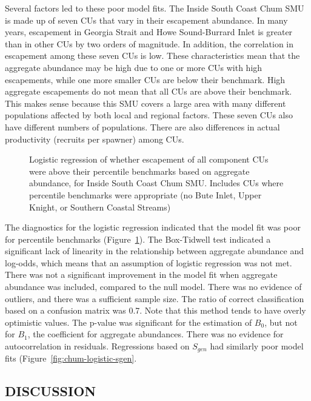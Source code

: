 \documentclass[11pt]{book}
\begin{document}
Several factors led to these poor model fits. The Inside South Coast Chum SMU is made up of seven CUs that vary in their escapement abundance. In many years, escapement in Georgia Strait and Howe Sound-Burrard Inlet is greater than in other CUs by two orders of magnitude. In addition, the correlation in escapement among these seven CUs is low. These characteristics mean that the aggregate abundance may be high due to one or more CUs with high escapements, while one more smaller CUs are below their benchmark. High aggregate escapements do not mean that all CUs are above their benchmark. This makes sense because this SMU covers a large area with many different populations affected by both local and regional factors. These seven CUs also have different numbers of populations. There are also differences in actual productivity (recruits per spawner) among CUs.
\begin{figure}[htb]

{\centering {} 

}

\caption{Logistic regression of whether escapement of all component CUs were above their percentile benchmarks based on aggregate abundance, for Inside South Coast Chum SMU. Includes CUs where percentile benchmarks were appropriate (no Bute Inlet, Upper Knight, or Southern Coastal Streams)}\label{fig:chum-logistic-perc}
\end{figure}
The diagnostics for the logistic regression indicated that the model fit was poor for percentile benchmarks (Figure~\ref{fig:chum-logistic-perc}). The Box-Tidwell test indicated a significant lack of linearity in the relationship between aggregate abundance and log-odds, which means that an assumption of logistic regression was not met. There was not a significant improvement in the model fit when aggregate abundance was included, compared to the null model. There was no evidence of outliers, and there was a sufficient sample size. The ratio of correct classification based on a confusion matrix was 0.7. Note that this method tends to have overly optimistic values. The p-value was significant for the estimation of \(B_{0}\), but not for \(B_{1}\), the coefficient for aggregate abundances. There was no evidence for autocorrelation in residuals. Regressions based on \(S_{gen}\) had similarly poor model fits (Figure~\ref{fig:chum-logistic-sgen}.

\hypertarget{discussion-1}{%
\subsection{DISCUSSION}\label{discussion-1}}
\end{document}
